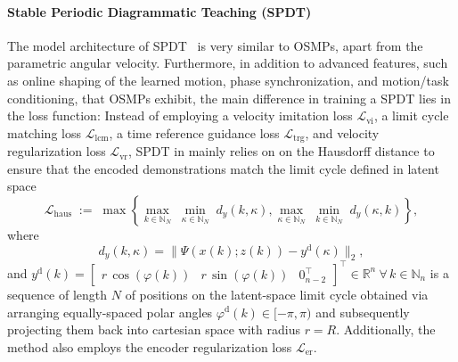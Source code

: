 \paragraph{Stable Periodic Diagrammatic Teaching (SPDT)}
The model architecture of \gls{SPDT}~\citep{zhi2024teaching} is very similar to \glspl{OSMP}, apart from the parametric angular velocity. Furthermore, in addition to  advanced features, such as online shaping of the learned motion, phase synchronization, and motion/task conditioning, that \glspl{OSMP} exhibit, the main difference in training a \gls{SPDT} lies in the loss function: Instead of employing a velocity imitation loss $\mathcal{L}_\mathrm{vi}$, a limit cycle matching loss $\mathcal{L}_\mathrm{lcm}$, a time reference guidance loss $\mathcal{L}_\mathrm{trg}$, and velocity regularization loss $\mathcal{L}_\mathrm{vr}$, \gls{SPDT} in mainly relies on on the Hausdorff distance to ensure that the encoded demonstrations match the limit cycle defined in latent space
\begin{equation}
     \mathcal{L}_\mathrm{haus} \;:=\; \max \left \{ \max_{k\in\mathbb{N}_N}\; \min_{\kappa\in\mathbb{N}_N} \; d_y(k, \kappa), \max_{\kappa \in\mathbb{N}_N}\; \min_{k\in\mathbb{N}_N} \; d_y(\kappa, k) \right \},
\end{equation}
where
\begin{equation}
    d_y(k, \kappa) = \lVert \Psi(x(k);z(k)) - y^\mathrm{d}(\kappa) \rVert_2,
\end{equation}
and $y^\mathrm{d}(k) = \begin{bmatrix}
    r \, \cos(\varphi(k)) & r \, \sin(\varphi(k)) & 0_{n-2}^\top
\end{bmatrix}^\top \in \mathbb{R}^n \: \forall \, k \in \mathbb{N}_n$ is a sequence of length $N$ of positions on the latent-space limit cycle obtained via arranging equally-spaced polar angles $\varphi^\mathrm{d}(k) \in [-\pi, \pi)$ and subsequently projecting them back into cartesian space with radius $r = R$.
Additionally, the method also employs the encoder regularization loss $\mathcal{L}_\mathrm{er}$.

